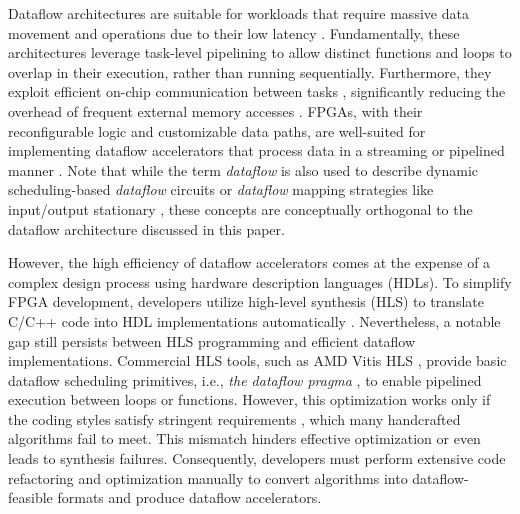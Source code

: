 \documentclass[conference]{IEEEtran}
\begin{document}
Dataflow architectures are suitable for workloads that require massive data movement and operations due to their low latency
\cite{abts2020think,jia2021tensorlib,gobieski2022riptide}. 
Fundamentally, these architectures leverage task-level pipelining to allow distinct functions and loops to overlap in their execution, rather than running sequentially. Furthermore, they exploit efficient on-chip communication between tasks \cite{ye2024hida,streamtensorMICRO25}, significantly reducing the overhead of frequent external memory accesses \cite{chenTRETS2024,nowatzki2017ISCA}. 
FPGAs, with their reconfigurable logic and customizable data paths, are well-suited for implementing dataflow accelerators that process data in a streaming or pipelined manner \cite{zhang2018dnnbuilder,kwon2021heterogeneous,lian2019high,andri2017yodann}. 
Note that while the term \textit{dataflow} is also used to describe dynamic scheduling-based \textit{dataflow} circuits \cite{dynamicHLS2018} or \textit{dataflow} mapping strategies like input/output stationary \cite{datareuse2017}, these concepts are conceptually orthogonal to the dataflow architecture discussed in this paper.

However, the high efficiency of dataflow accelerators comes at the expense of a complex design process using hardware description languages (HDLs). To simplify FPGA development, developers utilize high-level synthesis (HLS) to translate C/C++ code into HDL implementations automatically \cite{jasoncong2011hls}. 
Nevertheless, a notable gap still persists between HLS programming and efficient dataflow implementations. 
Commercial HLS tools, such as AMD Vitis HLS \cite{vitishls}, provide basic dataflow scheduling primitives, i.e., \textit{the dataflow pragma} \cite{hlsdataflow}, to enable pipelined execution between loops or functions. However, this optimization works only if the coding styles satisfy stringent requirements \cite{hlsdataflow}, which many handcrafted algorithms fail to meet. This mismatch hinders effective optimization or even leads to synthesis failures.
Consequently, developers must perform extensive code refactoring and optimization manually to convert algorithms into dataflow-feasible formats and produce dataflow accelerators.
\end{document}
